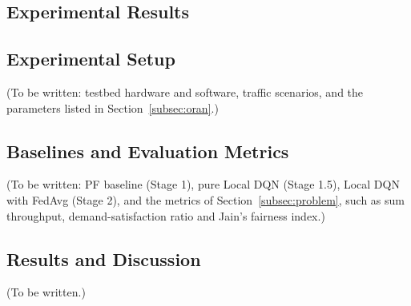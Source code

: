 \begin{EnChapter}

\chapter{Experimental Results}
\label{chap:experiments}


\section{Experimental Setup}

(To be written: testbed hardware and software, traffic scenarios, and the
parameters listed in Section~\ref{subsec:oran}.)

\section{Baselines and Evaluation Metrics}

(To be written: PF baseline (Stage 1), pure Local DQN (Stage 1.5), Local DQN with FedAvg (Stage 2), and the metrics of
Section~\ref{subsec:problem}, such as sum throughput, demand-satisfaction ratio and
Jain's fairness index.)

\section{Results and Discussion}

(To be written.)

\end{EnChapter}
